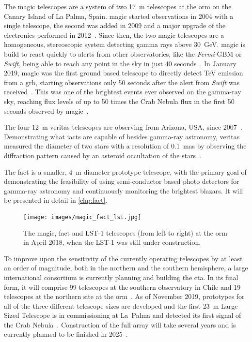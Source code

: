 The \gls{magic} telescopes are a system of two \SI{17}{\meter} telescopes 
at the \gls{orm} on the Canary Island of La Palma, Spain.
\gls{magic} started observations in 2004 with a single telescope, 
the second was added in 2009 and a major upgrade of the electronics performed in 2012~\cite{magic-performance}.
Since then, the two \gls{magic} telescopes are a homogeneous, stereoscopic system
detecting gamma rays above \SI{30}{\GeV}.
\gls{magic} is build to react quickly to alerts from other observatories, like
the \textit{Fermi}-GBM or \textit{Swift}, being able to reach any point in the sky
in just 40 seconds~\cite{magic-performance}.
In January 2019, \gls{magic} was the first ground based telescope to directly detect \si{\TeV} 
emission from a \gls{grb}, starting observations only 50 seconds after the alert from \textit{Swift} was received~\cite{magic-grb-atel}.
This was one of the brightest events ever observed on the gamma-ray sky, reaching flux levels of up
to 50 times the Crab Nebula flux in the first 50 seconds observed by \gls{magic}~\cite{magic-grb}.

The four \SI{12}{\meter} \gls{veritas} telescopes are observing from Arizona, USA,
since 2007~\cite{veritas}.
Demonstrating  what \glspl{iact} are capable of besides gamma-ray astronomy,
\gls{veritas} measured the diameter of two stars with a resolution of \SI{0.1}{\milli as}
by observing the diffraction pattern caused by an asteroid occultation of the stars~\cite{veritas-star}.

The \gls{fact} is a smaller, \SI{4}{\meter} diameter prototype telescope, with the
primary goal of demonstrating the feasibility of using semi-conductor based
photo detectors for gamma-ray astronomy and continuously monitoring the brightest blazars.
It will be presented in detail in \autoref{chp:fact}.

\begin{figure}[tb]
  \centering
  \texttt{[image: images/magic\_fact\_lst.jpg]}
  \caption{%
    The \gls{magic}, \gls{fact} and LST-1 telescopes (from left to right) at the \gls{orm} in April 2018,
    when the LST-1 was still under construction.
  }\label{fig:orm}
\end{figure}

To improve upon the sensitivity of the currently operating telescopes by at least 
an order of magnitude, both in the northern and the southern hemisphere, 
a large international consortium is currently planning and building the \gls{cta}.
In its final form, it will comprise 99 telescopes at the southern observatory in
Chile and 19 telescopes at the northern site at the \gls{orm}~\cite{science-cta}.
As of November 2019, prototypes for all of the three different telescope sizes
are developed and the first \SI{23}{\meter} Large Sized Telescope is in commissioning
at La~Palma and detected its first signal of the Crab Nebula~\cite{lst-crab}.
Construction of the full array will take several years and is currently planned
to be finished in 2025~\cite{cta-status}.

